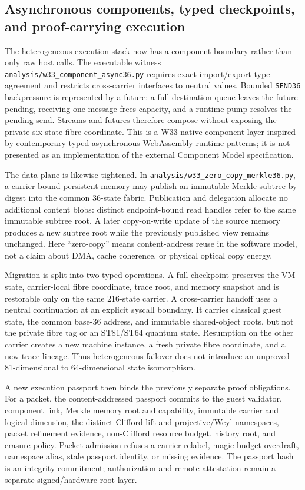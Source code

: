 \subsection{Asynchronous components, typed checkpoints, and proof-carrying execution}

The heterogeneous execution stack now has a component boundary rather than only
raw host calls.  The executable witness
\texttt{analysis/w33\_component\_async36.py} requires exact import/export type
agreement and restricts cross-carrier interfaces to neutral values.  Bounded
\texttt{SEND36} backpressure is represented by a future: a full destination
queue leaves the future pending, receiving one message frees capacity, and a
runtime pump resolves the pending send.  Streams and futures therefore compose
without exposing the private six-state fibre coordinate.  This is a W33-native
component layer inspired by contemporary typed asynchronous WebAssembly runtime
patterns; it is not presented as an implementation of the external Component
Model specification.

The data plane is likewise tightened.  In
\texttt{analysis/w33\_zero\_copy\_merkle36.py}, a carrier-bound persistent
memory may publish an immutable Merkle subtree by digest into the common
36-state fabric.  Publication and delegation allocate no additional content
blobs: distinct endpoint-bound read handles refer to the same immutable subtree
root.  A later copy-on-write update of the source memory produces a new subtree
root while the previously published view remains unchanged.  Here ``zero-copy''
means content-address reuse in the software model, not a claim about DMA,
cache coherence, or physical optical copy energy.

Migration is split into two typed operations.  A full checkpoint preserves the
VM state, carrier-local fibre coordinate, trace root, and memory snapshot and is
restorable only on the same 216-state carrier.  A cross-carrier handoff uses a
neutral continuation at an explicit syscall boundary.  It carries classical
guest state, the common base-36 address, and immutable shared-object roots, but
not the private fibre tag or an ST81/ST64 quantum state.  Resumption on the
other carrier creates a new machine instance, a fresh private fibre coordinate,
and a new trace lineage.  Thus heterogeneous failover does not introduce an
unproved 81-dimensional to 64-dimensional state isomorphism.

A new execution passport then binds the previously separate proof obligations.
For a packet, the content-addressed passport commits to the guest validator,
component link, Merkle memory root and capability, immutable carrier and logical
dimension, the distinct Clifford-lift and projective/Weyl namespaces, packet
refinement evidence, non-Clifford resource budget, history root, and erasure
policy.  Packet admission refuses a carrier relabel, magic-budget overdraft,
namespace alias, stale passport identity, or missing evidence.  The passport
hash is an integrity commitment; authorization and remote attestation remain a
separate signed/hardware-root layer.

